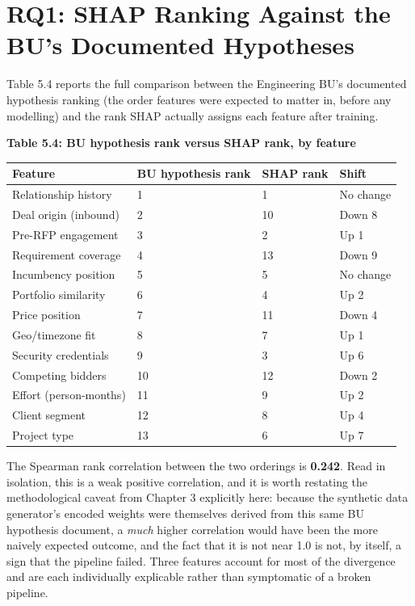 \hypertarget{rq1-shap-ranking-against-the-bus-documented-hypotheses}{%
\section{RQ1: SHAP Ranking Against the BU's Documented
Hypotheses}\label{rq1-shap-ranking-against-the-bus-documented-hypotheses}}

Table 5.4 reports the full comparison between the Engineering BU's
documented hypothesis ranking (the order features were expected to
matter in, before any modelling) and the rank SHAP actually assigns each
feature after training.

\textbf{Table 5.4: BU hypothesis rank versus SHAP rank, by feature}

\begin{longtable}[]{@{}llll@{}}
\toprule\noalign{}
Feature & BU hypothesis rank & SHAP rank & Shift \\
\midrule\noalign{}
\endhead
\bottomrule\noalign{}
\endlastfoot
Relationship history & 1 & 1 & No change \\
Deal origin (inbound) & 2 & 10 & Down 8 \\
Pre-RFP engagement & 3 & 2 & Up 1 \\
Requirement coverage & 4 & 13 & Down 9 \\
Incumbency position & 5 & 5 & No change \\
Portfolio similarity & 6 & 4 & Up 2 \\
Price position & 7 & 11 & Down 4 \\
Geo/timezone fit & 8 & 7 & Up 1 \\
Security credentials & 9 & 3 & Up 6 \\
Competing bidders & 10 & 12 & Down 2 \\
Effort (person-months) & 11 & 9 & Up 2 \\
Client segment & 12 & 8 & Up 4 \\
Project type & 13 & 6 & Up 7 \\
\end{longtable}

The Spearman rank correlation between the two orderings is
\textbf{0.242}. Read in isolation, this is a weak positive correlation,
and it is worth restating the methodological caveat from Chapter 3
explicitly here: because the synthetic data generator's encoded weights
were themselves derived from this same BU hypothesis document, a
\emph{much} higher correlation would have been the more naively expected
outcome, and the fact that it is not near 1.0 is not, by itself, a sign
that the pipeline failed. Three features account for most of the
divergence and are each individually explicable rather than symptomatic
of a broken pipeline.

